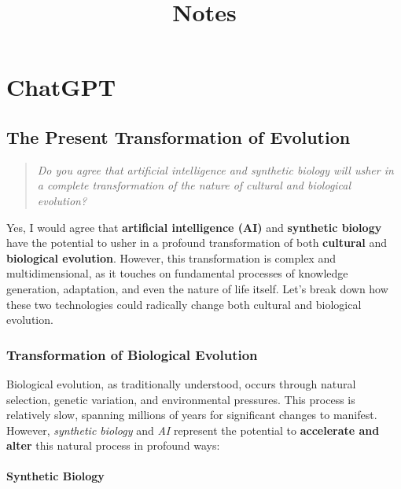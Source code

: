 \documentclass[12pt,titlepage]{book}
\title{\LARGE\bf Notes}
\author{}
\date{}
\begin{document}
\maketitle

\setcounter{tocdepth}{2}
{\parskip-0pt\tableofcontents}

\part{ChatGPT}

\chapter{The Present Transformation of Evolution}

\begin{quote}

\emph{Do you agree that artificial intelligence and synthetic biology will usher in a complete transformation of the nature of cultural and biological evolution?}

\end{quote}

Yes, I would agree that \textbf{artificial intelligence (AI)} and \textbf{synthetic biology} have the potential to usher in a profound transformation of both \textbf{cultural} and \textbf{biological evolution}. However, this transformation is complex and multidimensional, as it touches on fundamental processes of knowledge generation, adaptation, and even the nature of life itself. Let’s break down how these two technologies could radically change both cultural and biological evolution.

\section{Transformation of Biological Evolution}

Biological evolution, as traditionally understood, occurs through natural selection, genetic variation, and environmental pressures. This process is relatively slow, spanning millions of years for significant changes to manifest. However, \textit{synthetic biology} and \textit{AI} represent the potential to \textbf{accelerate and alter} this natural process in profound ways:

\subsection{Synthetic Biology}
\end{document}
